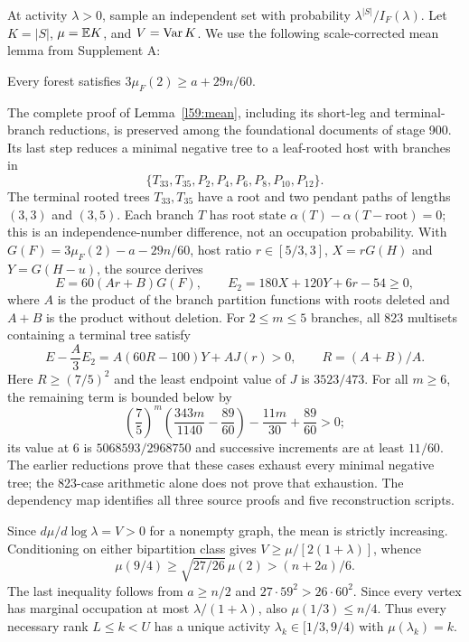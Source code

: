 At activity $\lambda>0$, sample an independent set with probability $\lambda^{|S|}/I_F(\lambda)$. Let $K=|S|$, $\mu=\mathbb E K$, and $V=\operatorname{Var} K$. We use the following scale-corrected mean lemma from Supplement A:
\begin{lemma}\label{l59:mean}
Every forest satisfies $3\mu_F(2)\ge a+29n/60$.
\end{lemma}
The complete proof of Lemma~\ref{l59:mean}, including its short-leg and terminal-branch reductions, is preserved among the foundational documents of stage 900. Its last step reduces a minimal negative tree to a leaf-rooted host with branches in
\[
 \{T_{33},T_{35},P_2,P_4,P_6,P_8,P_{10},P_{12}\}.
\]
The terminal rooted trees $T_{33},T_{35}$ have a root and two pendant paths of lengths $(3,3)$ and $(3,5)$. Each branch $T$ has root state $\alpha(T)-\alpha(T-\mathrm{root})=0$; this is an independence-number difference, not an occupation probability. With $G(F)=3\mu_F(2)-a-29n/60$, host ratio $r\in[5/3,3]$, $X=rG(H)$ and $Y=G(H-u)$, the source derives
\[
 E=60(Ar+B)G(F),\qquad E_2=180X+120Y+6r-54\ge0,
\]
where $A$ is the product of the branch partition functions with roots deleted and $A+B$ is the product without deletion. For $2\le m\le5$ branches, all 823 multisets containing a terminal tree satisfy
\[
 E-\frac A3E_2=A(60R-100)Y+A J(r)>0,\qquad R=(A+B)/A.
\]
Here $R\ge(7/5)^2$ and the least endpoint value of $J$ is $3523/473$. For all $m\ge6$, the remaining term is bounded below by
\[
 \left(\frac75\right)^m\left(\frac{343m}{1140}-\frac{89}{60}\right)
 -\frac{11m}{30}+\frac{89}{60}>0;
\]
its value at 6 is $5068593/2968750$ and successive increments are at least $11/60$. The earlier reductions prove that these cases exhaust every minimal negative tree; the 823-case arithmetic alone does not prove that exhaustion. The dependency map identifies all three source proofs and five reconstruction scripts.

Since $d\mu/d\log\lambda=V>0$ for a nonempty graph, the mean is strictly increasing. Conditioning on either bipartition class gives $V\ge\mu/[2(1+\lambda)]$, whence
\[
 \mu(9/4)\ge\sqrt{27/26}\,\mu(2)>(n+2a)/6.
\]
The last inequality follows from $a\ge n/2$ and $27\cdot59^2>26\cdot60^2$. Since every vertex has marginal occupation at most $\lambda/(1+\lambda)$, also $\mu(1/3)\le n/4$. Thus every necessary rank $L\le k<U$ has a unique activity $\lambda_k\in[1/3,9/4)$ with $\mu(\lambda_k)=k$.

